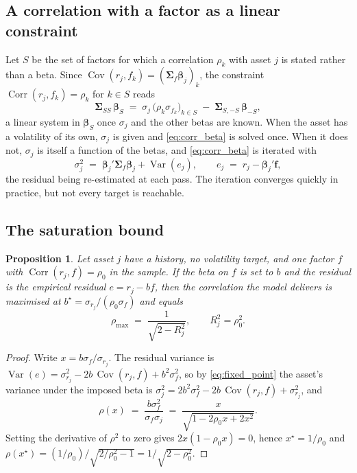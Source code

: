 \documentclass[11pt]{article}
\newtheorem{proposition}{Proposition}
\DeclareMathOperator{\Var}{Var}
\DeclareMathOperator{\Cov}{Cov}
\DeclareMathOperator{\Corr}{Corr}
\newcommand{\bbeta}{\boldsymbol\beta}
\newcommand{\bSigma}{\boldsymbol\Sigma}
\newcommand{\bff}{\mathbf f}
\begin{document}
\subsection{A correlation with a factor as a linear constraint}

Let $S$ be the set of factors for which a correlation $\rho_k$ with asset $j$
is stated rather than a beta. Since $\Cov(r_j, f_k) = (\bSigma_f
\bbeta_j)_k$, the constraint $\Corr(r_j, f_k) = \rho_k$ for $k \in S$ reads
\begin{equation}\label{eq:corr_beta}
  \bSigma_{SS}\, \bbeta_S \;=\; \sigma_j\, \big(\rho_k \sigma_{f_k}\big)_{k \in S}
     \;-\; \bSigma_{S,-S}\, \bbeta_{-S} ,
\end{equation}
a linear system in $\bbeta_S$ once $\sigma_j$ and the other betas are known.
When the asset has a volatility of its own, $\sigma_j$ is given and
\eqref{eq:corr_beta} is solved once. When it does not, $\sigma_j$ is itself a
function of the betas, and \eqref{eq:corr_beta} is iterated with
\begin{equation}\label{eq:fixed_point}
  \sigma_j^2 \;=\; \bbeta_j' \bSigma_f \bbeta_j + \Var(e_j), \qquad
  e_j \;=\; r_j - \bbeta_j' \bff ,
\end{equation}
the residual being re-estimated at each pass. The iteration converges quickly
in practice, but not every target is reachable.

\subsection{The saturation bound}

\begin{proposition}\label{prop:sat}
Let asset $j$ have a history, no volatility target, and one factor $f$ with
$\Corr(r_j, f) = \rho_0$ in the sample. If the beta on $f$ is set to $b$ and
the residual is the empirical residual $e = r_j - bf$, then the correlation the
model delivers is maximised at $b^\star = \sigma_{r_j} / (\rho_0 \sigma_f)$ and
equals
\begin{equation}\label{eq:rho_max}
  \rho_{\max} \;=\; \frac{1}{\sqrt{2 - R_j^2}}, \qquad R_j^2 = \rho_0^2 .
\end{equation}
\end{proposition}

\begin{proof}
Write $x = b \sigma_f / \sigma_{r_j}$. The residual variance is
$\Var(e) = \sigma_{r_j}^2 - 2b\,\Cov(r_j, f) + b^2 \sigma_f^2$, so by
\eqref{eq:fixed_point} the asset's variance under the imposed beta is
$\sigma_j^2 = 2b^2\sigma_f^2 - 2b\,\Cov(r_j,f) + \sigma_{r_j}^2$, and
\[
  \rho(x) \;=\; \frac{b \sigma_f^2}{\sigma_f \sigma_j}
           \;=\; \frac{x}{\sqrt{1 - 2\rho_0 x + 2x^2}} .
\]
Setting the derivative of $\rho^2$ to zero gives $2x(1 - \rho_0 x) = 0$, hence
$x^\star = 1/\rho_0$ and $\rho(x^\star) = (1/\rho_0) / \sqrt{2/\rho_0^2 - 1} =
1/\sqrt{2 - \rho_0^2}$.
\end{proof}
\end{document}
